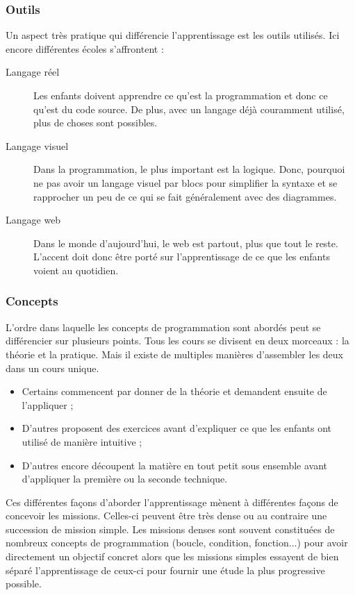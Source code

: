 \subsubsection{Outils} 
Un aspect très pratique qui différencie l'apprentissage est les outils utilisés. Ici encore différentes écoles s'affrontent :
\begin{description}
  \item[Langage réel] Les enfants doivent apprendre ce qu'est la programmation et donc ce qu'est du code source. De plus, avec un langage déjà couramment utilisé, plus de choses sont possibles.
  \item[Langage visuel] Dans la programmation, le plus important est la logique. Donc, pourquoi ne pas avoir un langage visuel par blocs pour simplifier la syntaxe et se rapprocher un peu de ce qui se fait généralement avec des diagrammes.
  \item[Langage web] Dans le monde d'aujourd'hui, le web est partout, plus que tout le reste. L’accent doit donc être porté sur l'apprentissage de ce que les enfants voient au quotidien.
\end{description}

\subsubsection{Concepts} 
L'ordre dans laquelle les concepts de programmation sont abordés peut se différencier sur plusieurs points. Tous les cours se divisent en deux morceaux : la théorie et la pratique. Mais il existe de multiples manières d'assembler les deux dans un cours unique.
\begin{itemize}
  \item Certains commencent par donner de la théorie et demandent ensuite de l'appliquer ;
  \item D'autres proposent des exercices avant d'expliquer ce que les enfants ont utilisé de manière intuitive ;
  \item D'autres encore découpent la matière en tout petit sous ensemble avant d'appliquer la première ou la seconde technique.\\
  \end{itemize}


Ces différentes façons d'aborder l'apprentissage mènent à différentes façons de concevoir les missions. Celles-ci peuvent être très dense ou au contraire une succession de mission simple. Les missions denses sont souvent constituées de nombreux concepts de programmation (boucle, condition, fonction...) pour avoir directement un objectif concret alors que les missions simples essayent de bien séparé l'apprentissage de ceux-ci pour fournir une étude la plus progressive possible.\\

